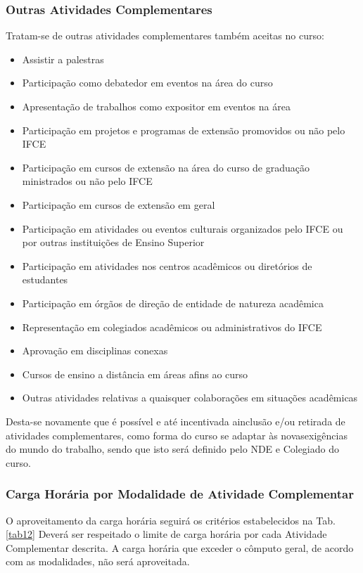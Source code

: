 \subsubsection{Outras Atividades Complementares}
Tratam-se de outras atividades complementares também aceitas no curso:
\begin{itemize}
	\item Assistir a palestras
	\item Participação como debatedor em eventos na área do curso
	\item Apresentação de trabalhos como expositor em eventos na área
	\item Participação em projetos e programas de extensão promovidos ou não pelo IFCE
	\item Participação em cursos de extensão na área do curso de graduação ministrados ou não pelo IFCE
	\item Participação em cursos de extensão em geral
	\item Participação em atividades ou eventos culturais organizados pelo IFCE ou por outras instituições de Ensino Superior
	\item Participação em atividades nos centros acadêmicos ou diretórios de estudantes
	\item Participação em órgãos de direção de entidade de natureza acadêmica
	\item Representação em colegiados acadêmicos ou administrativos do IFCE
	\item Aprovação em disciplinas conexas
	\item Cursos de ensino a distância em áreas afins ao curso
	\item Outras atividades relativas a quaisquer colaborações em situações acadêmicas
\end{itemize}

Desta-se novamente que é possível e até incentivada ainclusão e/ou retirada de atividades complementares, como forma do curso se adaptar às novasexigências do mundo do trabalho, sendo que isto será definido pelo NDE e Colegiado do curso.

\subsubsection{Carga Horária por Modalidade de Atividade Complementar}

O aproveitamento da carga horária seguirá os critérios estabelecidos na Tab. \ref{tab12} Deverá ser respeitado o limite de carga horária por cada Atividade Complementar descrita. A carga horária que exceder o cômputo geral, de acordo com as modalidades, não será aproveitada.

